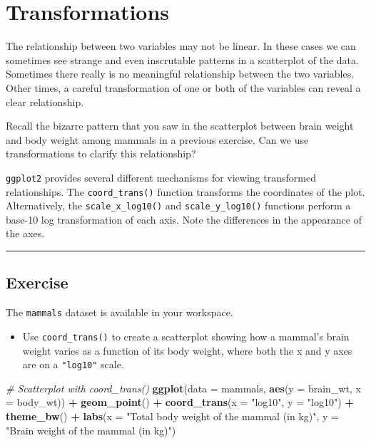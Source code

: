 \documentclass[
]{book}
\newenvironment{Shaded}{\begin{snugshade}}{\end{snugshade}}
\newcommand{\CommentTok}[1]{\textcolor[rgb]{0.56,0.35,0.01}{\textit{#1}}}
\newcommand{\DataTypeTok}[1]{\textcolor[rgb]{0.13,0.29,0.53}{#1}}
\newcommand{\KeywordTok}[1]{\textcolor[rgb]{0.13,0.29,0.53}{\textbf{#1}}}
\newcommand{\NormalTok}[1]{#1}
\newcommand{\OperatorTok}[1]{\textcolor[rgb]{0.81,0.36,0.00}{\textbf{#1}}}
\newcommand{\StringTok}[1]{\textcolor[rgb]{0.31,0.60,0.02}{#1}}
\providecommand{\tightlist}{%
  \setlength{\itemsep}{0pt}\setlength{\parskip}{0pt}}
\begin{document}
\hypertarget{transformations}{%
\section{Transformations}\label{transformations}}

The relationship between two variables may not be linear. In these cases we can sometimes see strange and even inscrutable patterns in a scatterplot of the data. Sometimes there really is no meaningful relationship between the two variables. Other times, a careful transformation of one or both of the variables can reveal a clear relationship.

Recall the bizarre pattern that you saw in the scatterplot between brain weight and body weight among mammals in a previous exercise. Can we use transformations to clarify this relationship?

\texttt{ggplot2} provides several different mechanisms for viewing transformed relationships. The \texttt{coord\_trans()} function transforms the coordinates of the plot. Alternatively, the \texttt{scale\_x\_log10()} and \texttt{scale\_y\_log10()} functions perform a base-10 log transformation of each axis. Note the differences in the appearance of the axes.

\begin{center}\rule{0.5\linewidth}{0.5pt}\end{center}

\hypertarget{exercise-3}{%
\subsection*{Exercise}\label{exercise-3}}

The \texttt{mammals} dataset is available in your workspace.

\begin{itemize}
\tightlist
\item
  Use \texttt{coord\_trans()} to create a scatterplot showing how a mammal's brain weight varies as a function of its body weight, where both the x and y axes are on a \texttt{"log10"} scale.
\end{itemize}

\begin{Shaded}
\begin{Highlighting}[]
\CommentTok{# Scatterplot with coord_trans()}
\KeywordTok{ggplot}\NormalTok{(}\DataTypeTok{data =}\NormalTok{ mammals, }\KeywordTok{aes}\NormalTok{(}\DataTypeTok{y =}\NormalTok{ brain_wt, }\DataTypeTok{x =}\NormalTok{ body_wt)) }\OperatorTok{+}\StringTok{ }
\StringTok{  }\KeywordTok{geom_point}\NormalTok{() }\OperatorTok{+}\StringTok{ }
\StringTok{  }\KeywordTok{coord_trans}\NormalTok{(}\DataTypeTok{x =} \StringTok{"log10"}\NormalTok{, }\DataTypeTok{y =} \StringTok{"log10"}\NormalTok{) }\OperatorTok{+}\StringTok{ }
\StringTok{  }\KeywordTok{theme_bw}\NormalTok{() }\OperatorTok{+}
\StringTok{  }\KeywordTok{labs}\NormalTok{(}\DataTypeTok{x =} \StringTok{"Total body weight of the mammal (in kg)"}\NormalTok{,}
       \DataTypeTok{y =} \StringTok{"Brain weight of the mammal (in kg)"}\NormalTok{)}
\end{Highlighting}
\end{Shaded}
\end{document}
